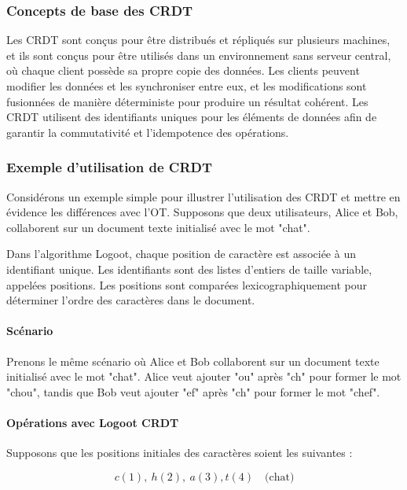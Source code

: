\subsubsection{Concepts de base des CRDT}

Les CRDT sont conçus pour être distribués et répliqués sur plusieurs machines, et ils sont conçus pour être utilisés dans un environnement sans serveur central, où chaque client possède sa propre copie des données. Les clients peuvent modifier les données et les synchroniser entre eux, et les modifications sont fusionnées de manière déterministe pour produire un résultat cohérent. Les CRDT utilisent des identifiants uniques pour les éléments de données afin de garantir la commutativité et l'idempotence des opérations.

\subsubsection{Exemple d'utilisation de CRDT}
Considérons un exemple simple pour illustrer l'utilisation des CRDT et mettre en évidence les différences avec l'OT. Supposons que deux utilisateurs, Alice et Bob, collaborent sur un document texte initialisé avec le mot "chat".

Dans l'algorithme Logoot, chaque position de caractère est associée à un identifiant unique. Les identifiants sont des listes d'entiers de taille variable, appelées positions. Les positions sont comparées lexicographiquement pour déterminer l'ordre des caractères dans le document.

\paragraph{Scénario}

Prenons le même scénario où Alice et Bob collaborent sur un document texte initialisé avec le mot "chat". Alice veut ajouter "ou" après "ch" pour former le mot "chou", tandis que Bob veut ajouter "ef" après "ch" pour former le mot "chef".

\paragraph{Opérations avec Logoot CRDT}

Supposons que les positions initiales des caractères soient les suivantes :

\begin{equation}
    c(1),\ h(2), \ a(3), t(4) \quad \text{(chat)}
\end{equation}

